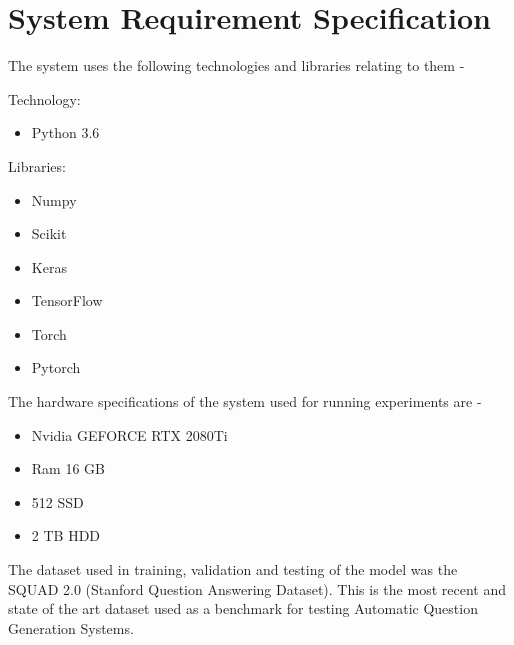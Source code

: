 \chapter{System Requirement Specification}

The system uses the following technologies and libraries relating to them -

Technology: 

\begin{itemize}

\item Python 3.6 

\end{itemize}

Libraries: 

\begin{itemize}

\item Numpy
\item Scikit
\item Keras
\item TensorFlow
\item Torch
\item Pytorch

\end{itemize}

The hardware specifications of the system used for running experiments are - 

\begin{itemize}

\item Nvidia GEFORCE RTX 2080Ti
\item Ram 16 GB
\item 512 SSD
\item 2 TB HDD

\end{itemize}

The dataset used in training, validation and testing of the model was the SQUAD
2.0 (Stanford Question Answering Dataset). This is the most recent and state of
the art dataset used as a benchmark for testing Automatic Question Generation
Systems. 

